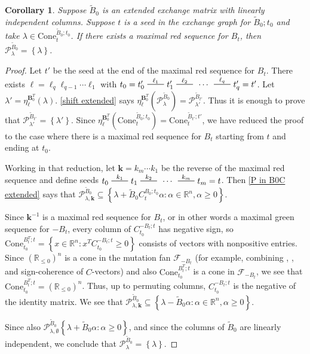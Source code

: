 \documentclass{amsart}
\newtheorem{corollary}[proposition]{Corollary}
\theoremstyle{definition}
\theoremstyle{remark}
\numberwithin{equation}{section}
\newcommand{\reals}{\mathbb R}
\newcommand{\edge}{\,\,\rule[2.7pt]{20pt}{0.5pt}\,\,}
\newcommand{\set}[1]{{\left\lbrace #1 \right\rbrace}}
\newcommand{\F}{{\mathcal F}}
\newcommand{\0}{{\mathbf{0}}}
\newcommand{\Cone}{\mathrm{Cone}}
\newcommand{\kk}{\mathbf{k}}
\renewcommand{\ll}{{\boldsymbol\ell}}
\newcommand{\tB}{{\tilde{B}}}
\newcommand{\BB}{\mathbf{B}}
\renewcommand{\P}{\mathcal{P}}
\begin{document}
\begin{corollary}\label{P point}
Suppose $\tB_0$ is an extended exchange matrix with linearly independent columns.
Suppose $t$ is a seed in the exchange graph for $\tB_0;t_0$ and take $\lambda\in\Cone^{\tB_0;t_0}_t$.
If there exists a maximal red sequence for $B_t$, then $\P^{\tB_0}_\lambda=\set{\lambda}$.
\end{corollary}

\begin{proof}%
Let $t'$ be the seed at the end of the maximal red sequence for $B_t$.
There exists $\ll=\ell_q\ell_{q-1}\cdots\ell_1$ with $t_0=t'_0\overset{\ell_1}{\edge}t'_1\overset{\ell_2}{\edge}\,\cdots\,\overset{\ell_q}{\edge}t'_q=t'$.
Let $\lambda'=\eta^{\BB_0^T}_\ll\!(\lambda)$.
\cref{shift extended} says $\eta^{\BB_0^T}_\ll\!(\P^{\tB_0}_\lambda)=\P^{\tB_{t'}}_{\lambda'}$.
Thus it is enough to prove that $\P^{\tB_{t'}}_{\lambda'}=\set{\lambda'}$.
Since $\eta_\ll^{\BB_0^T}\left(\Cone_t^{\tB_0;t_0}\right)=\Cone_t^{\tB_{t'};t'}$, we have reduced the proof to the case where there is a maximal red sequence for $B_t$ starting from $t$ and ending at $t_0$.

Working in that reduction, let $\kk=k_m\cdots k_1$ be the reverse of the maximal red sequence and define seeds $t_0\overset{k_1}{\edge}t_1\overset{k_2}{\edge}\,\cdots\,\overset{k_m}{\edge}t_m=t$.
Then \cref{P in B0C extended} says that $\P^{\tB_0}_{\lambda,\kk}\subseteq\set{\lambda+\tB_0C_t^{B_0;t_0}\alpha:\alpha\in\reals^n,\alpha\ge0}$.

Since $\kk^{-1}$ is a maximal red sequence for $B_t$, or in other words a maximal green sequence for $-B_t$, every column of $C_{t_0}^{-B_t;t}$ has negative sign, so $\Cone_{t_0}^{B_t^T;t}=\set{x\in\reals^n:x^TC_{t_0}^{-B_t;t}\ge0}$ consists of vectors with nonpositive entries.
Since $\left(\reals_{\le0}\right)^n$ is a cone in the mutation fan $\F_{-B_t}$ (for example, combining \mbox{\cite[Proposition~7.1]{universal}}, \mbox{\cite[Proposition~8.9]{universal}}, and sign-coherence of $C$-vectors) and also $\Cone_{t_0}^{B_t^T;t}$ is a cone in $\F_{-B_t}$, we see that $\Cone_{t_0}^{B_t^T;t}=\left(\reals_{\le0}\right)^n$.
Thus, up to permuting columns, $C_{t_0}^{-B_t;t}$ is the negative of the identity matrix.
We see that $\P^{\tB_0}_{\lambda,\kk}\subseteq\set{\lambda-\tB_0\alpha:\alpha\in\reals^n,\alpha\ge0}$.

Since also $\P^{\tB_0}_{\lambda,\emptyset}\set{\lambda+\tB_0\alpha:\alpha\ge0}$, and since the columns of $\tB_0$ are linearly independent, we conclude that $\P^{\tB_0}_\lambda=\set{\lambda}$.
\end{proof}
\end{document}

